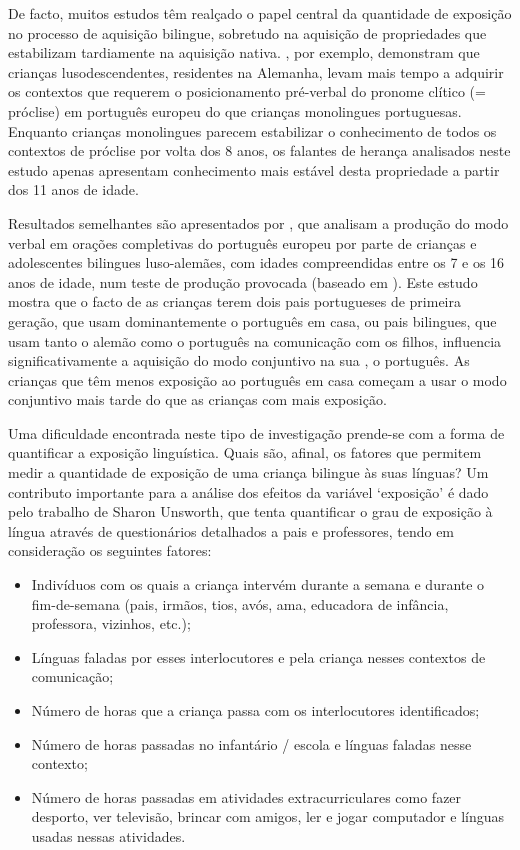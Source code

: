 \documentclass[output=paper]{LSP/langsci}
\begin{document}
De facto, muitos estudos têm realçado o papel central da quantidade de exposição no processo de aquisição bilingue, sobretudo na aquisição de propriedades que estabilizam tardiamente na aquisição nativa. \cite{barbosaflores2001}, por exemplo, demonstram que crianças lusodescendentes, residentes na Alemanha, levam mais tempo a adquirir os contextos que requerem o posicionamento pré-verbal do pronome clítico (= próclise) em português europeu do que crianças monolingues portuguesas. Enquanto crianças monolingues parecem estabilizar o conhecimento de todos os contextos de próclise por volta dos 8 anos, os falantes de herança analisados neste estudo apenas apresentam conhecimento mais estável desta propriedade a partir dos 11 anos de idade. 

Resultados semelhantes são apresentados por \cite{flores_etal2016}, que analisam a produção do modo verbal em orações completivas do português europeu por parte de crianças e adolescentes bilingues luso-alemães, com idades compreendidas entre os 7 e os 16 anos de idade, num teste de produção provocada (baseado em \citealt{jesus2014}). Este estudo mostra que o facto de as crianças terem dois pais portugueses de primeira geração, que usam dominantemente o português em casa, ou pais bilingues, que usam tanto o alemão como o português na comunicação com os filhos, influencia significativamente a aquisição do modo conjuntivo na sua , o português. As crianças que têm menos exposição ao português em casa começam a usar o modo conjuntivo mais tarde do que as crianças com mais exposição.

Uma dificuldade encontrada neste tipo de investigação prende-se com a forma de quantificar a exposição linguística. Quais são, afinal, os fatores que permitem medir a quantidade de exposição de uma criança bilingue às suas línguas? Um contributo importante para a análise dos efeitos da variável `exposição' é dado pelo trabalho de Sharon Unsworth, que tenta quantificar o grau de exposição à língua através de questionários detalhados a pais e professores, tendo em consideração os seguintes fatores:

\begin{itemize}
\item Indivíduos com os quais a criança intervém durante a semana e durante o fim-de-semana (pais, irmãos, tios, avós, ama, educadora de infância, professora, vizinhos, etc.); 
\item Línguas faladas por esses interlocutores e pela criança nesses contextos de comunicação;
\item Número de horas que a criança passa com os interlocutores identificados;
\item Número de horas passadas no infantário / escola e línguas faladas nesse contexto;
\item Número de horas passadas em atividades extracurriculares como fazer desporto, ver televisão, brincar com amigos, ler e jogar computador e línguas usadas nessas atividades.
\end{itemize}
\end{document}
